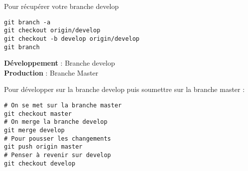 \documentclass[fleqn,11pt]{article}
\begin{document}
Pour récupérer votre branche develop

\begin{lstlisting}
git branch -a
git checkout origin/develop
git checkout -b develop origin/develop
git branch
\end{lstlisting}

\noindent\textbf{Développement} : Branche develop\\
\textbf{Production} : Branche Master

Pour développer sur la branche develop puis soumettre sur la branche master :

\begin{lstlisting}
# On se met sur la branche master
git checkout master
# On merge la branche develop
git merge develop
# Pour pousser les changements
git push origin master
# Penser à revenir sur develop
git checkout develop
\end{lstlisting}
\end{document}
